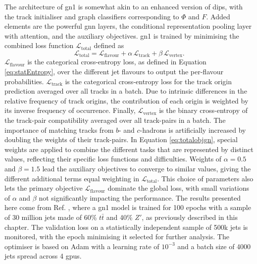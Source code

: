 The architecture of \gls{gn1} is somewhat akin to an enhanced version of \gls{dips}, with the track initialiser and graph classifiers corresponding to $\Phi$ and $F$. Added elements are the powerful \gls{gnn} layers, the conditional representation pooling layer with attention, and the auxiliary objectives. \gls{gn1} is trained by  minimising the combined loss function $\mathcal{L}_{\textrm{total}}$ defined as 
\begin{equation}\label{eq:totalobjgn}
  \mathcal{L}_{\textrm{total}} = \mathcal{L}_{\textrm{flavour}} + \alpha \, \mathcal{L}_{\textrm{track}} + \beta \, \mathcal{L}_{\textrm{vertex}}.
\end{equation}
$\mathcal{L}_{\textrm{flavour}}$ is the categorical cross-entropy loss, as defined in Equation \ref{eq:statEntropy}, over the different jet flavours to output the per-flavour probabilities. $\mathcal{L}_{\textrm{track}}$ is the categorical cross-entropy loss for the track origin prediction averaged over all tracks in a batch. Due to intrinsic differences in the relative frequency of track origins, the contribution of each origin is weighted by its inverse frequency of occurrence. Finally, $\mathcal{L}_{\textrm{vertex}}$ is the binary cross-entropy of the track-pair compatibility averaged over all track-pairs in a batch. The importance of matching tracks from $b$- and $c$-hadrons is artificially increased by doubling the weights of their track-pairs. In Equation \ref{eq:totalobjgn}, special weights are applied to combine the different tasks that are represented by distinct values, reflecting their specific loss functions and difficulties. Weights of $\alpha = 0.5$ and $\beta = 1.5$ \cite{ATL-PHYS-PUB-2022-027} lead the auxiliary objectives to converge to similar values, giving the different additional terms equal weighting in $\mathcal{L}_{\textrm{total}}$. This choice of parameters also lets the primary objective $\mathcal{L}_{\textrm{flavour}}$ dominate the global loss, with small variations of $\alpha$ and $\beta$ not significantly impacting the performance. The results presented here come from Ref. \cite{ATL-PHYS-PUB-2022-027}, where a \gls{gn1} model is trained for 100 epochs with a sample of 30 million jets made of 60\% $t\bar{t}$ and 40\% $Z'$, as previously described in this chapter. The validation loss on a statistically independent sample of 500k jets is monitored, with the epoch minimising it selected for further analysis. The optimiser is based on Adam \cite{adamPaper} with a learning rate of $10^{-3}$ and a batch size of 4000 jets spread across 4 \glspl{gpu}. \\

